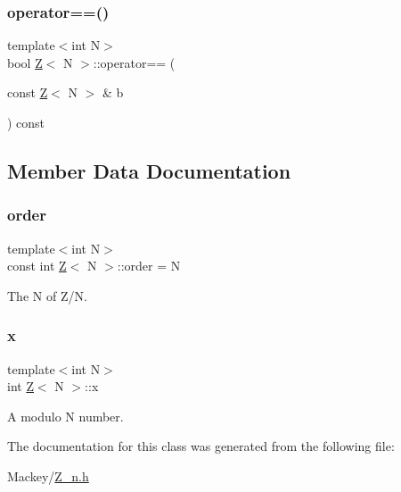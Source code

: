 \mbox{\label{classZ_aee67aee77949c30eb8a0645d7248044c}} 
\subsubsection{\texorpdfstring{operator==()}{operator==()}}
{\footnotesize\ttfamily template$<$int N$>$ \\
bool \hyperlink{classZ}{Z}$<$ N $>$\+::operator== (\begin{DoxyParamCaption}\item[{const \hyperlink{classZ}{Z}$<$ N $>$ \&}]{b }\end{DoxyParamCaption}) const\hspace{0.3cm}{\ttfamily [inline]}}



\subsection{Member Data Documentation}
\mbox{\label{classZ_a8da63061091de9ee7a146a856f70c4b8}} 
\subsubsection{\texorpdfstring{order}{order}}
{\footnotesize\ttfamily template$<$int N$>$ \\
const int \hyperlink{classZ}{Z}$<$ N $>$\+::order = N\hspace{0.3cm}{\ttfamily [static]}}



The N of Z/N. 

\mbox{\label{classZ_a81f004f23dff9772403dd7a4452ad3c6}} 
\subsubsection{\texorpdfstring{x}{x}}
{\footnotesize\ttfamily template$<$int N$>$ \\
int \hyperlink{classZ}{Z}$<$ N $>$\+::x}



A modulo N number. 



The documentation for this class was generated from the following file\+:\begin{DoxyCompactItemize}
\item 
Mackey/\hyperlink{Z__n_8h}{Z\+\_\+n.\+h}\end{DoxyCompactItemize}
